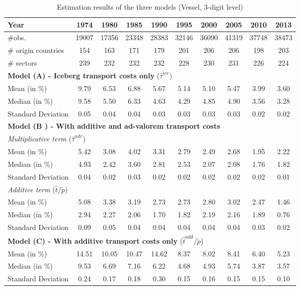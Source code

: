 \documentclass[11pt,twoside, authoryear]{elsarticle}
\begin{document}
\begin{table}[htbp]
  \centering
   \footnotesize{
    \caption{Estimation results of the three models (Vessel, 3-digit level)}
  \label{tab:3models_estimation_results_vessel}%
    \begin{tabular}{l|c c c c c c c c c}
    \hline \hline
    \textbf{Year} & 1974  & 1980  & 1985  & 1990  & 1995  & 2000  & 2005  & 2010  & 2013 \\ \hline
    $\# $obs. & 19007 & 17356 & 23348 & 28383 & 32146 & 36090 & 41319 & 37748 & 38473 \\
    $\#$  origin countries & 154   & 163   & 171   & 179   & 201   & 206   & 206   & 198   & 203 \\
    $\#$  sectors & 239   & 232   & 232   & 232   & 228   & 230   & 231   & 226   & 224 \\ \hline
    \multicolumn{10}{l}{\textbf{Model (A) - Iceberg transport costs only} ($\widehat{\tau}^{ice}$)} \\ \hline
    Mean (in \%) & 9.79  & 6.53  & 6.88  & 5.67  & 5.14  & 5.10  & 5.47  & 3.99  & 3.60 \\
    Median (in \%)& 9.58  & 5.50  & 6.33  & 4.63  & 4.29  & 4.85  & 4.90  & 3.56  & 3.28 \\
    Standard Deviation & 0.05  & 0.04  & 0.04  & 0.03  & 0.03  & 0.03  & 0.03  & 0.02  & 0.02 \\ \hline
    \multicolumn{10}{l}{\textbf{Model (B ) - With additive and ad-valorem transport costs} } \\ \hline
     \multicolumn{10}{l}{\textit{Multiplicative term} ($\widehat{\tau}^{adv}$)} \\ \hline
    Mean (in \%) & 5.42  & 3.08  & 4.02  & 3.31  & 2.79  & 2.49  & 2.68  & 1.95  & 2.22 \\
    Median (in \%) & 4.93  & 2.42  & 3.60  & 2.81  & 2.53  & 2.07  & 2.08  & 1.76  & 1.82 \\
    Standard Deviation & 0.04  & 0.02  & 0.03  & 0.02  & 0.02  & 0.02  & 0.02  & 0.02  & 0.01 \\ \hline
       \multicolumn{10}{l}{\textit{Additive term} ($\widehat{t}/\widetilde{p}$)}  \\ \hline
    Mean (in \%)  & 5.08  & 3.38  & 3.19  & 2.73  & 2.73  & 2.80  & 3.02  & 2.47  & 1.46 \\
    Median (in \%) & 2.94  & 2.27  & 2.06  & 1.70  & 1.82  & 2.19  & 2.16  & 1.89  & 0.76 \\
    Standard Deviation & 0.09  & 0.05  & 0.04  & 0.04  & 0.04  & 0.04  & 0.04  & 0.03  & 0.02 \\ \hline
    \multicolumn{10}{l}{\textbf{Model (C) - With additive transport costs only} ($\widehat{t}^{add}/\widetilde{p}$)} \\ \hline
    Mean (in \%) & 14.51 & 10.05 & 10.47 & 14.62 & 8.37  & 8.02  & 8.41  & 6.40  & 5.23 \\
    Median (in \%)& 9.53  & 6.69  & 7.16  & 6.22  & 4.68  & 4.93  & 5.74  & 3.87  & 3.57 \\
    Standard Deviation & 0.24  & 0.17  & 0.18  & 0.30  & 0.15  & 0.16  & 0.15  & 0.15  & 0.10 \\ \hline \hline
   \end{tabular}%
   }
\end{table}%
\end{document}
